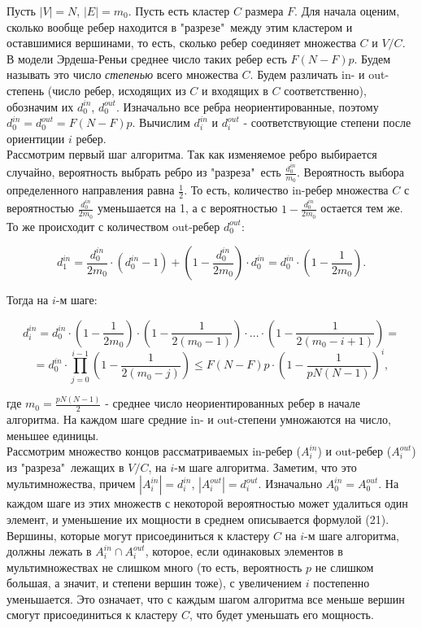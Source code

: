 Пусть $|V|=N$, $|E|=m_0$. Пусть есть кластер $C$ размера $F$. Для начала оценим, сколько вообще ребер находится в "разрезе"\ между этим кластером и оставшимися вершинами, то есть, сколько ребер соединяет множества $C$ и $V/C$. В модели Эрдеша-Реньи среднее число таких ребер есть $F(N-F)p$. Будем называть это число \textit{степенью} всего множества $C$. Будем различать in- и out-степень (число ребер, исходящих из $C$ и входящих в $C$ соответственно), обозначим их $d_0^{in}$, $d_0^{out}$. Изначально все ребра неориентированные, поэтому $d_0^{in}= d_0^{out}=F(N-F)p$. Вычислим $d_i^{in}$ и $d_i^{out}$ - соответствующие степени после ориентиции $i$ ребер.\\

Рассмотрим первый шаг алгоритма. Так как изменяемое ребро выбирается случайно, вероятность выбрать ребро из "разреза"\ есть $\frac{d^{in}_0}{m_0}$. Вероятность выбора определенного направления равна $\frac{1}{2}$. То есть, количество in-ребер множества $C$ с вероятностью $\frac{d_0^{in}}{2m_0}$ уменьшается на 1, а с вероятностью $1-\frac{d_0^{in}}{2m_0}$ остается тем же. То же происходит с количеством out-ребер $d_0^{out}$:

\begin{equation}
	d_1^{in}=\frac{d_0^{in}}{2m_0}\cdot (d_0^{in}-1)+(1-\frac{d_0^{in}}{2m_0})\cdot d_0^{in} = d_0^{in}\cdot (1-\frac{1}{2m_0}).
\end{equation}

Тогда на $i$-м шаге:

\begin{equation*}
	d_i^{in}=d_0^{in}\cdot (1-\frac{1}{2m_0})\cdot(1-\frac{1}{2(m_0-1)})\cdot...\cdot (1-\frac{1}{2(m_0-i+1)}) =
\end{equation*}
\begin{equation}
	 =d_0^{in}\cdot\prod_{j=0}^{i-1}(1-\frac{1}{2(m_0-j)})\leq F(N-F)p\cdot(1-\frac{1}{pN(N-1)})^i,
\end{equation}

где $m_0=\frac{pN(N-1)}{2}$ - среднее число неориентированных ребер в начале алгоритма. На каждом шаге средние in- и out-степени умножаются на число, меньшее единицы.\\

Рассмотрим множество концов рассматриваемых in-ребер ($A_i^{in}$) и out-ребер ($A_i^{out}$) из "разреза"\, лежащих в $V/C$, на $i$-м шаге алгоритма. Заметим, что это мультимножества, причем $|A_i^{in}|=d_i^{in}$, $|A_i^{out}|=d_i^{out}$. Изначально $A_0^{in}=A_0^{out}$. На каждом шаге из этих множеств с некоторой вероятностью может удалиться один элемент, и уменьшение их мощности в среднем описывается формулой (21). Вершины, которые могут присоединиться к кластеру $C$ на $i$-м шаге алгоритма, должны лежать в $A_i^{in}\cap A_i^{out}$, которое, если одинаковых элементов в мультимножествах не слишком много (то есть, вероятность $p$ не слишком большая, а значит, и степени вершин тоже), с увеличением $i$ постепенно уменьшается. Это означает, что с каждым шагом алгоритма все меньше вершин смогут присоединиться к кластеру $C$, что будет уменьшать его мощность.\\

